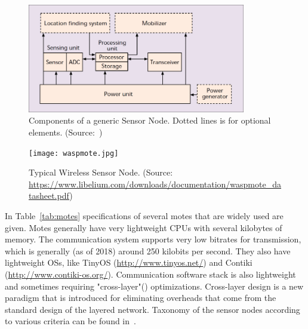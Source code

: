 \documentclass[12pt, oneandhalf, chaparabic, sees, ms]{metu}
\begin{document}
\vspace{2cm}
\begin{figure}[!htbp]
 \begin{center}
  \includegraphics[width=0.85\textwidth]{wsn-arch2.png}
 \end{center}
 \caption{Components of a generic Sensor Node. Dotted lines is for optional elements. (Source:~\protect\cite{akyildiz2002}) }
  \label{fig:parts-mote}
\end{figure}
%

\begin{figure}[!htbp]
 \begin{center}
  \texttt{[image: waspmote.jpg]}
 \end{center}
 \caption{Typical Wireless Sensor Node. (Source: {\url{https://www.libelium.com/downloads/documentation/waspmote_datasheet.pdf}})  }
  \label{fig:typical-mote}
\end{figure}
%
% 
%

\newpage
In Table~\ref{tab:motes} specifications of several motes that are widely used are given. Motes generally have very lightweight CPUs with several kilobytes of memory.
The communication system supports very low bitrates for transmission, which is generally (as of 2018) around 250 kilobits per second. They also have lightweight OSs, 
like TinyOS (\url{http://www.tinyos.net/}) and Contiki (\url{http://www.contiki-os.org/}). Communication software stack is also lightweight and sometimes 
requiring "cross-layer"(\cite{sah2018}) optimizations. Cross-layer design is a new paradigm that is introduced for eliminating overheads that come from the standard 
design of the layered network. Taxonomy of the sensor nodes according to various criteria can be found in~\cite[pp.~81-84]{sohraby2007}.
%
\end{document}
